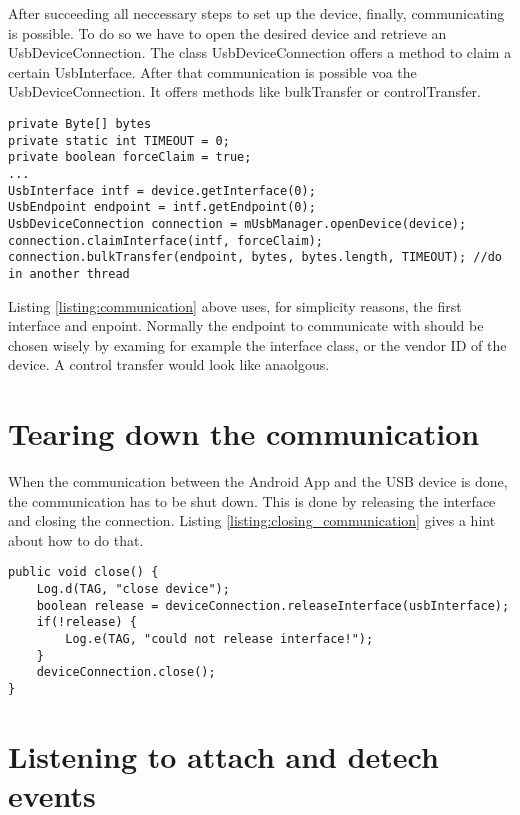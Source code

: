 After succeeding all neccessary steps to set up the device, finally, communicating is possible. To do so we have to open the desired device and retrieve an UsbDeviceConnection. The class UsbDeviceConnection offers a method to claim a certain UsbInterface. After that communication is possible voa the UsbDeviceConnection. It offers methods like bulkTransfer or controlTransfer.

\begin{lstlisting}[caption=Communicating with a connected device \cite{android_usb_host}, label=listing:communication]
private Byte[] bytes
private static int TIMEOUT = 0;
private boolean forceClaim = true;
...
UsbInterface intf = device.getInterface(0);
UsbEndpoint endpoint = intf.getEndpoint(0);
UsbDeviceConnection connection = mUsbManager.openDevice(device); 
connection.claimInterface(intf, forceClaim);
connection.bulkTransfer(endpoint, bytes, bytes.length, TIMEOUT); //do in another thread
\end{lstlisting}

Listing \ref{listing:communication} above uses, for simplicity reasons, the first interface and enpoint. Normally the endpoint to communicate with should be chosen wisely by examing for example the interface class, or the vendor ID of the device. A control transfer would look like anaolgous.

\section{Tearing down the communication}

When the communication between the Android App and the USB device is done, the communication has to be shut down. This is done by releasing the interface and closing the connection. Listing \ref{listing:closing_communication} gives a hint about how to do that.

\begin{lstlisting}[caption=Closing communication, label=listing:closing_communication]
public void close() {
	Log.d(TAG, "close device");
	boolean release = deviceConnection.releaseInterface(usbInterface);
	if(!release) {
		Log.e(TAG, "could not release interface!");
	}
	deviceConnection.close();
}
\end{lstlisting}

\section{Listening to attach and detech events}

